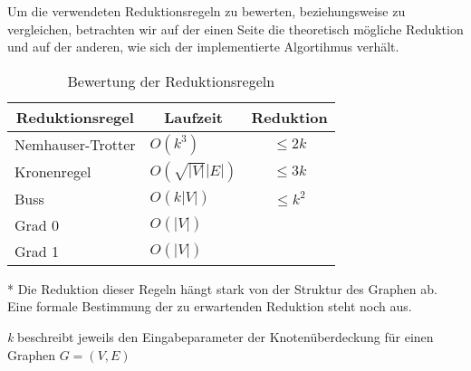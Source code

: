 Um die verwendeten Reduktionsregeln zu bewerten, beziehungsweise zu vergleichen, betrachten wir auf der einen Seite die theoretisch mögliche Reduktion und auf der anderen, wie sich der implementierte Algortihmus verhält. 



\begin{table}[htb]
\caption{Bewertung der Reduktionsregeln\label{tab:liste}}
\vspace*{1em}
\centering

\bgroup
\def\arraystretch{1.3}%

\begin{threeparttable}

\begin{tabular}[c]{l|l|c}
	
	\multicolumn{1}{c|}{\textbf{Reduktionsregel}} & 
	\multicolumn{1}{c|}{\textbf{Laufzeit}} & 
	\multicolumn{1}{c}{\textbf{Reduktion}} \\ 
	
	\hline

	Nemhauser-Trotter&$O(k^{3})$&  $\leq 2k$\\
	Kronenregel&$O(\sqrt{|V|}|E|)$ & $\leq 3k$\\
	Buss&$O(k|V|)$  & $\leq k^{2}$\\
	Grad 0&$O(|V|)$& \tnote{*} \\
	Grad 1&$O(|V|)$& \tnote{*} \\
	
\end{tabular}

\begin{tablenotes}\footnotesize
\item[*] Die Reduktion dieser Regeln hängt stark von der Struktur des Graphen ab. Eine formale Bestimmung der zu erwartenden Reduktion steht noch aus.
\item \emph{k} beschreibt jeweils den Eingabeparameter der Knotenüberdeckung für einen Graphen $G=(V,E)$
\end{tablenotes}

\end{threeparttable}

\egroup

\end{table}

